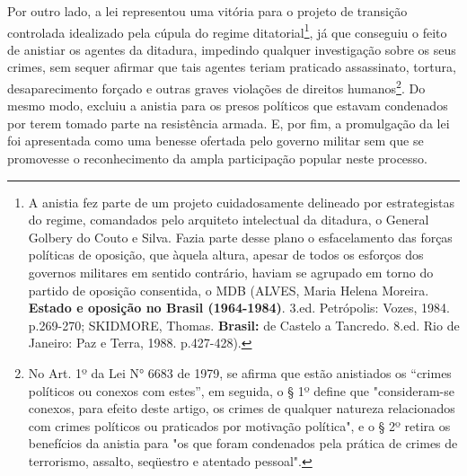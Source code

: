 Por outro lado, a lei representou uma vitória para o projeto de
transição controlada idealizado pela cúpula do regime
ditatorial\footnote{A anistia fez parte de um projeto cuidadosamente
  delineado por estrategistas do regime, comandados pelo arquiteto
  intelectual da ditadura, o General Golbery do Couto e Silva. Fazia
  parte desse plano o esfacelamento das forças políticas de oposição,
  que àquela altura, apesar de todos os esforços dos governos militares
  em sentido contrário, haviam se agrupado em torno do partido de
  oposição consentida, o MDB (ALVES, Maria Helena Moreira.
  \textbf{Estado e oposição no Brasil (1964-1984)}. 3.ed. Petrópolis:
  Vozes, 1984. p.269-270; SKIDMORE, Thomas. \textbf{Brasil:} de Castelo
  a Tancredo. 8.ed. Rio de Janeiro: Paz e Terra, 1988. p.427-428).}, já
que conseguiu o feito de anistiar os agentes da ditadura, impedindo
qualquer investigação sobre os seus crimes, sem sequer afirmar que tais
agentes teriam praticado assassinato, tortura, desaparecimento forçado e
outras graves violações de direitos humanos\footnote{No Art. 1º da Lei
  N° 6683 de 1979, se afirma que estão anistiados os ``crimes políticos
  ou conexos com estes'', em seguida, o § 1º define que "consideram-se
  conexos, para efeito deste artigo, os crimes de qualquer natureza
  relacionados com crimes políticos ou praticados por motivação
  política", e o § 2º retira os benefícios da anistia para "os que foram
  condenados pela prática de crimes de terrorismo, assalto, seqüestro e
  atentado pessoal".}. Do mesmo modo, excluiu a anistia para os presos
políticos que estavam condenados por terem tomado parte na resistência
armada. E, por fim, a promulgação da lei foi apresentada como uma
benesse ofertada pelo governo militar sem que se promovesse o
reconhecimento da ampla participação popular neste processo.

